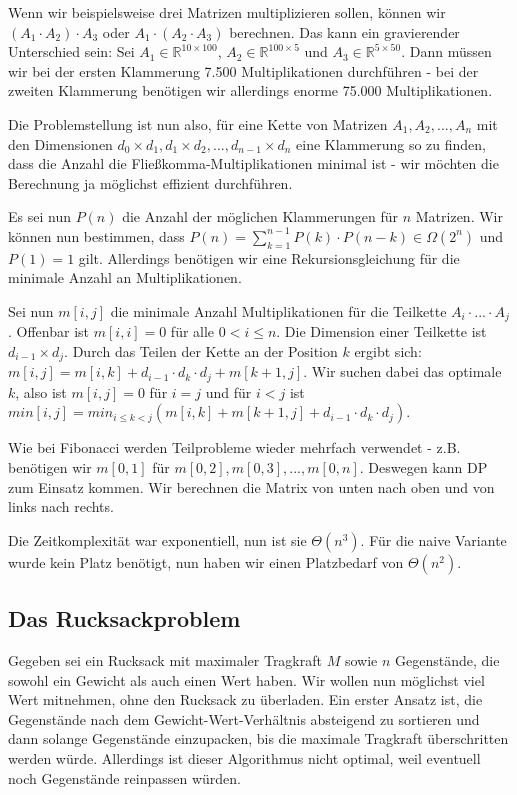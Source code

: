 \documentclass[12pt]{article}
\begin{document}
Wenn wir beispielsweise drei Matrizen multiplizieren sollen, können wir $(A_1 \cdot A_2) \cdot A_3$ oder $A_1 \cdot (A_2 \cdot A_3)$ berechnen. Das kann ein gravierender Unterschied sein: Sei $A_1 \in \mathbb{R}^{10 \times 100}$, $A_2 \in \mathbb{R}^{100 \times 5}$ und $A_3 \in \mathbb{R}^{5 \times 50}$. Dann müssen wir bei der ersten Klammerung 7.500 Multiplikationen durchführen - bei der zweiten Klammerung benötigen wir allerdings enorme 75.000 Multiplikationen.

Die Problemstellung ist nun also, für eine Kette von Matrizen $A_1, A_2, ..., A_n$ mit den Dimensionen $d_0 \times d_1, d_1 \times d_2, ..., d_{n-1} \times d_n$ eine Klammerung so zu finden, dass die Anzahl die Fließkomma-Multiplikationen minimal ist - wir möchten die Berechnung ja möglichst effizient durchführen.

Es sei nun $P(n)$ die Anzahl der möglichen Klammerungen für $n$ Matrizen. Wir können nun bestimmen, dass $P(n) = \sum_{k = 1}^{n - 1} P(k) \cdot P(n-k) \in \Omega(2^n)$ und $P(1) = 1$ gilt. Allerdings benötigen wir eine Rekursionsgleichung für die minimale Anzahl an Multiplikationen.

Sei nun $m[i,j]$ die minimale Anzahl Multiplikationen für die Teilkette $A_i \cdot ... \cdot A_j$. Offenbar ist $m[i,i] = 0$ für alle $0 < i \leq n$. Die Dimension einer Teilkette ist $d_{i-1} \times d_j$. Durch das Teilen der Kette an der Position $k$ ergibt sich: $m[i,j] = m[i,k] + d_{i-1} \cdot d_k \cdot d_j + m[k+1,j]$. Wir suchen dabei das optimale $k$, also ist $m[i,j] = 0$ für $i = j$ und für $i<j$ ist $min[i,j]=min_{i \leq k < j}(m[i,k]+m[k+1,j]+d_{i-1} \cdot d_k \cdot d_j)$.

Wie bei Fibonacci werden Teilprobleme wieder mehrfach verwendet - z.B. benötigen wir $m[0,1]$ für $m[0,2], m[0,3], ..., m[0,n]$. Deswegen kann DP zum Einsatz kommen. Wir berechnen die Matrix von unten nach oben und von links nach rechts.

Die Zeitkomplexität war exponentiell, nun ist sie $\Theta(n^3)$. Für die naive Variante wurde kein Platz benötigt, nun haben wir einen Platzbedarf von $\Theta(n^2)$.

\subsection{Das Rucksackproblem}

Gegeben sei ein Rucksack mit maximaler Tragkraft $M$ sowie $n$ Gegenstände, die sowohl ein Gewicht als auch einen Wert haben. Wir wollen nun möglichst viel Wert mitnehmen, ohne den Rucksack zu überladen. Ein erster Ansatz ist, die Gegenstände nach dem Gewicht-Wert-Verhältnis absteigend zu sortieren und dann solange Gegenstände einzupacken, bis die maximale Tragkraft überschritten werden würde. Allerdings ist dieser Algorithmus nicht optimal, weil eventuell noch Gegenstände reinpassen würden.
\end{document}
